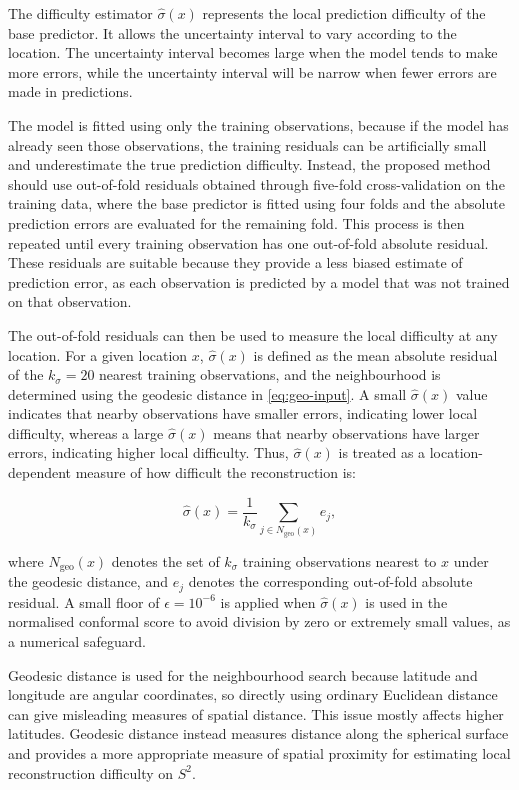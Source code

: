 The difficulty estimator $\hat\sigma(x)$ represents the local prediction difficulty of the base predictor. It allows the uncertainty interval to vary according to the location. The uncertainty interval becomes large when the model tends to make more errors, while the uncertainty interval will be narrow when fewer errors are made in predictions.

The model is fitted using only the training observations, because if the model has already seen those observations, the training residuals can be artificially small and underestimate the true prediction difficulty. Instead, the proposed method should use out-of-fold residuals obtained through five-fold cross-validation on the training data, where the base predictor is fitted using four folds and the absolute prediction errors are evaluated for the remaining fold. This process is then repeated until every training observation has one out-of-fold absolute residual. These residuals are suitable because they provide a less biased estimate of prediction error, as each observation is predicted by a model that was not trained on that observation. 
 
The out-of-fold residuals can then be used to measure the local difficulty at any location. For a given location $x$, $\hat\sigma(x)$ is defined as the mean absolute residual of the $k_\sigma=20$ nearest training observations, and the neighbourhood is determined using the geodesic distance in \cref{eq:geo-input}. A small $\hat\sigma(x)$ value indicates that nearby observations have smaller errors, indicating lower local difficulty, whereas a large $\hat\sigma(x)$ means that nearby observations have larger errors, indicating higher local difficulty. Thus,  $\hat\sigma(x)$ is treated as a location-dependent measure of how difficult the reconstruction is:

\begin{equation}
\hat\sigma(x)
=
\frac{1}{k_\sigma}
\sum_{j\in N_{\mathrm{geo}}(x)} e_j,
\end{equation}

where $N_{\mathrm{geo}}(x)$ denotes the set of $k_\sigma$ training observations nearest to $x$ under the geodesic distance, and $e_j$ denotes the corresponding out-of-fold absolute residual. A small floor of $\epsilon=10^{-6}$ is applied when $\hat\sigma(x)$ is used in the normalised conformal score to avoid division by zero or extremely small values, as a numerical safeguard.

Geodesic distance is used for the neighbourhood search because latitude and longitude are angular coordinates, so directly using ordinary Euclidean distance can give misleading measures of spatial distance. This issue mostly affects higher latitudes. Geodesic distance instead measures distance along the spherical surface and provides a more appropriate measure of spatial proximity for estimating local reconstruction difficulty on $S^2$.

